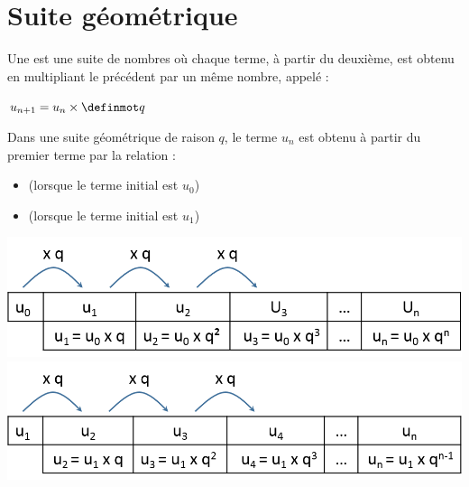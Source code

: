 \documentclass[12pt,a4paper]{article}
\begin{document}
\section{Suite géométrique}


\begin{mydef}
	Une  est une suite de nombres où chaque terme, à partir du deuxième, est obtenu en multipliant le précédent par un même nombre, appelé  :
	
	\begin{center}
		$u_{n+1}=u_n \times \kw{q}$
	\end{center} 
\end{mydef}

\begin{myprop}
	Dans une suite géométrique de raison $q$, le terme $u_n$ est obtenu à partir du premier terme par la relation :
	\begin{itemize}
		\item {} (lorsque le terme initial est $u_0$) 
		\item {} (lorsque le terme initial est $u_1$)
	\end{itemize}
	
	\begin{multicols}{2}
		\includegraphics[scale=0.45]{./img/geo1}
		\includegraphics[scale=0.45]{./img/geo2}
	\end{multicols}
\end{myprop}


%
\end{document}
